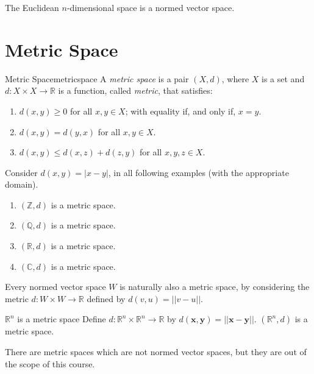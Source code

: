 \begin{prop}{}{}
	The Euclidean \(n\)-dimensional space is a normed vector space.
\end{prop}

\section{Metric Space}

\begin{defn}{Metric Space}{metricspace}
	A \emph{metric space} is a pair \((X, d)\), where \(X\) is a set and \(d\colon X \times X \to \mathbb{R}\) is a function, called \emph{metric}, that satisfies:
	\begin{enumerate}[label = \textbullet]
		\item \(d(x, y) \geq 0\) for all \(x, y \in X\); with equality if, and only if, \(x = y\).
		\item \(d(x, y) = d(y, x)\) for all \(x, y \in X\). 
		\item \(d(x, y) \leq d(x, z) + d(z, y)\) for all \(x, y, z \in X\).
	\end{enumerate}
\end{defn}

\begin{exmp}{}{}
	Consider \(d(x, y) = |x - y|\), in all following examples (with the appropriate domain).
	\begin{enumerate}[label = \textbullet]
		\item \((\mathbb{Z}, d)\) is a metric space.
		\item \((\mathbb{Q}, d)\) is a metric space.
		\item \((\mathbb{R}, d)\) is a metric space.
		\item \((\mathbb{C}, d)\) is a metric space.
	\end{enumerate}
\end{exmp}

Every normed vector space \(W\) is naturally also a metric space, by considering the metric \(d: W \times W \to \mathbb{R}\) defined by \(d(v, u) = ||v - u||\).

\begin{exmp}{\(\mathbb{R}^n\) is a metric space}{}
	Define \(d \colon \mathbb{R}^n \times \mathbb{R}^n \to \mathbb{R}\) by \(d(\mathbf x, \mathbf y) = ||\mathbf x - \mathbf y||\). \((\mathbb{R}^n, d)\) is a metric space.
\end{exmp}

There are metric spaces which are not normed vector spaces, but they are out of the scope of this course.

